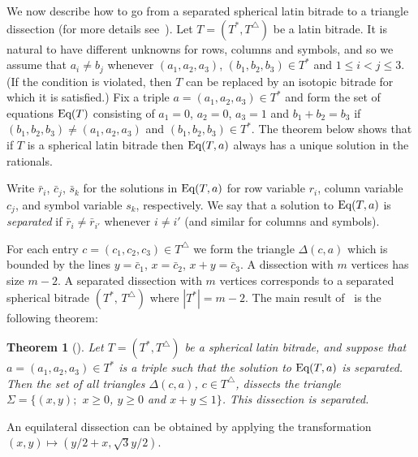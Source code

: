 \documentclass[12pt,amstags,fleqn]{article}
\theoremstyle{plain}
\newtheorem{theorem}{Theorem}[section]
\theoremstyle{definition}
\theoremstyle{definition}
\def\ll{{\textstyle \ast}}
\def\rr{{\scriptscriptstyle \triangle}}
\newcommand{\opa}{\ll}
\newcommand{\opb}{\rr}
\newcommand{\eq}{\textnormal{Eq}}
\begin{document}
We now describe how to go from a separated spherical latin bitrade to a
triangle dissection (for more details see~\cite{alesdissections}).  
Let $T= (T^\ll, T^\rr)$ be a latin bitrade. It is natural to have
different unknowns for rows, columns and symbols, and so we assume
that $a_i \ne b_j$ whenever $(a_1,a_2,a_3)$, $(b_1,b_2,b_3) \in T^\ll$
and $1 \le i < j \le 3$.  (If the condition is violated,  then $T$
can be replaced by an isotopic bitrade for which it is satisfied.)
Fix a triple $a = (a_1,a_2,a_3) \in T^\ll$ and form the set of equations
$\eq(T)$ consisting of
$a_1=0$, $a_2=0$, $a_3 =1$
and 
$b_1+b_2 = b_3$  if $(b_1,b_2,b_3) \neq (a_1,a_2,a_3)$
and $(b_1,b_2,b_3) \in T^\ll$.
The theorem below shows that if $T$ is a spherical latin
bitrade then $\eq(T, a)$ always has a unique solution in the rationals.

Write
$\bar r_i$,
$\bar c_j$,
$\bar s_k$
for the solutions in $\eq(T, a)$ for row variable $r_i$, column variable
$c_j$, and symbol variable $s_k$, respectively. We say that 
a solution to $\eq(T, a)$ is {\em separated} if 
$\bar r_i \neq \bar r_{i'}$ whenever $i \neq i'$ (and similar for
columns and symbols).

For each entry $c = (c_1,c_2,c_3) \in T^\rr$ we form the triangle
$\Delta(c,a)$ which is bounded by the lines
$y = \bar c_1$,
$x = \bar c_2$,
$x + y = \bar c_3$.
A dissection with $m$ vertices has size $m-2$. A separated dissection 
with $m$ vertices corresponds to a separated spherical bitrade
$(T^{\opa},\, T^{\opb})$ where $\left| T^{\opa} \right| = m-2$.  
The main result of~\cite{alesdissections} is the following theorem:

\begin{theorem}[\cite{alesdissections}]\label{sepdissections}
Let $T=(T^\ll, T^\rr)$ be a spherical latin bitrade,
and suppose that $a=(a_1,a_2,a_3) \in T^\ll$ is a triple such
that the solution to $\eq(T,a)$ is separated. Then the set
of all triangles $\Delta(c,a)$, $c \in T^\rr$, dissects the triangle
$\Sigma = \{(x,y);$ $x\ge 0$, $y\ge 0$ and $x+y \le 1\}$. This
dissection is separated.
\end{theorem}

An equilateral dissection can be obtained by applying the transformation
$(x,y) \mapsto (y/2 + x, \sqrt 3 y/2)$.
\end{document}
